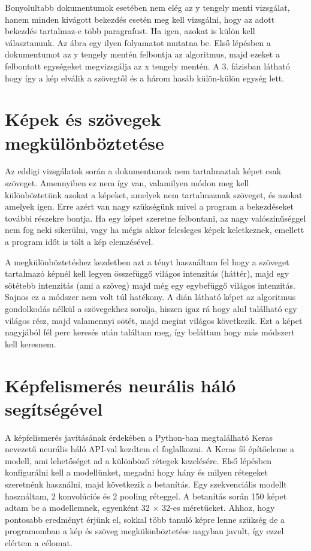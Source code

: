 \documentclass{article}
\begin{document}
Bonyolultabb dokumentumok esetében nem elég az y tengely menti vizsgálat, hanem minden kivágott bekezdés esetén meg kell vizsgálni, hogy az adott bekezdés tartalmaz-e több paragrafust.
Ha igen, azokat is külön kell választanunk.
Az ábra egy ilyen folyamatot mutatna be. Első lépésben a dokumentumot az y tengely mentén felbontja az algoritmus, majd ezeket a felbontott egységeket megvizsgálja az x tengely mentén. A 3. fázisban látható hogy így a kép elválik a szövegtől és a három hasáb külön-külön egység lett.

\section{Képek és szövegek megkülönböztetése}

Az eddigi vizsgálatok során a dokumentumok nem tartalmaztak képet csak szöveget. Amennyiben ez nem így van, valamilyen módon meg kell különböztetünk azokat a képeket, amelyek nem tartalmaznak szöveget, és azokat amelyek igen. Erre azért van nagy szükségünk mivel a program a bekezdéseket további részekre bontja. Ha egy képet szeretne felbontani, az nagy valószínűséggel nem fog neki sikerülni, vagy ha mégis akkor felesleges képek keletkeznek, emellett a program időt is tölt a kép elemzésével.

A megkülönböztetéshez kezdetben azt a tényt használtam fel hogy a szöveget tartalmazó képnél kell legyen összefüggő világos intenzitás (háttér), majd egy sötétebb intenzitás (ami a szöveg) majd még egy egybefüggő világos intenzitás. Sajnos ez a módszer nem volt túl hatékony. A dián látható képet az algoritmus gondolkodás nélkül a szövegekhez sorolja, hiszen igaz rá hogy alul található egy világos rész, majd valamennyi sötét, majd megint világos következik. Ezt a képet nagyjából fél perc keresés után találtam meg, így beláttam hogy más módszert kell keresnem.

\section{Képfelismerés neurális háló segítségével}

A képfelismerés javításának érdekében a Python-ban megtalálható Keras nevezetű neurális háló API-val kezdtem el foglalkozni.
A Keras fő építőeleme a modell, ami lehetőséget ad a különböző rétegek kezelésére.
Első lépésben konfigurálni kell a modellünket, megadni hogy hány és milyen rétegeket szeretnénk használni, majd következik a betanítás.
Egy szekvenciális modellt használtam, 2 konvolúciós és 2 pooling réteggel. A betanítás során 150 képet adtam be a modellemnek, egyenként 32 × 32-es méretűeket.
Ahhoz, hogy pontosabb eredményt érjünk el, sokkal több tanuló képre lenne szükség de a programomban a kép és szöveg megkülönböztetése nagyban javult, így ezzel elértem a célomat.
\end{document}
